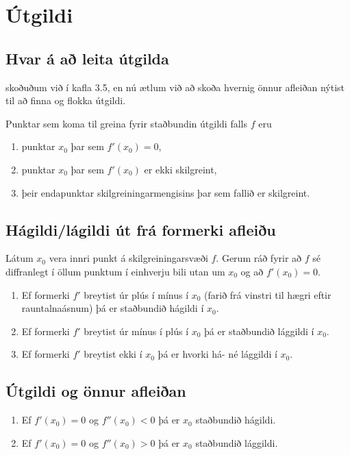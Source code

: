 \documentclass[a4paper,10pt,icelandic]{sphinxmanual}
\begin{document}
\section{Útgildi}
\label{kafli05:utgildi}\label{kafli05:index-3}

\subsection{Hvar á að leita útgilda}
\label{kafli05:hvar-a-a-leita-utgilda}
{\hyperref[kafli03:utgildi]{}}  skoðuðum við í kafla 3.5, en nú ætlum við að skoða
hvernig önnur afleiðan nýtist til að finna og flokka útgildi.

Punktar sem koma til greina fyrir staðbundin útgildi falls \(f\) eru
\begin{enumerate}
\item {} 
punktar \(x_0\) þar sem \(f'(x_0)=0\),

\item {} 
punktar \(x_0\) þar sem \(f'(x_0)\) er ekki skilgreint,

\item {} 
þeir endapunktar skilgreiningarmengisins þar sem fallið er
skilgreint.

\end{enumerate}


\subsection{Hágildi/lágildi út frá formerki afleiðu}
\label{kafli05:hagildi-lagildi-ut-fra-formerki-afleiu}
Látum \(x_0\) vera innri punkt á skilgreiningarsvæði \(f\).
Gerum ráð fyrir að \(f\) sé diffranlegt í öllum punktum í einhverju
bili utan um \(x_0\) og að \(f'(x_0)=0\).
\begin{enumerate}
\item {} 
Ef formerki \(f'\) breytist úr plús í mínus í \(x_0\)
(farið frá vinstri til hægri eftir rauntalnaásnum) þá er
staðbundið hágildi í \(x_0\).

\item {} 
Ef formerki \(f'\) breytist úr mínus í plús í \(x_0\) þá
er staðbundið lággildi í \(x_0\).

\item {} 
Ef formerki \(f'\) breytist ekki í \(x_0\) þá er hvorki
há- né lággildi í \(x_0\).

\end{enumerate}


\subsection{Útgildi og önnur afleiðan}
\label{kafli05:utgildi-og-onnur-afleian}\begin{enumerate}
\item {} 
Ef \(f'(x_0)=0\) og \(f''(x_0)<0\) þá er \(x_0\)
staðbundið hágildi.

\item {} 
Ef \(f'(x_0)=0\) og \(f''(x_0)>0\) þá er \(x_0\)
staðbundið lággildi.

\end{enumerate}
\end{document}
